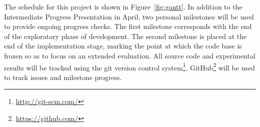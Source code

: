 The schedule for this project is shown in Figure~\ref{fig:gantt}. In
addition to the Intermediate Progress Presentation in April, two
personal milestones will be used to provide ongoing progress
checks. The first milestone corresponds with the end of the
exploratory phase of development. The second milestone is placed at
the end of the implementation stage, marking the point at which the
code base is frozen so as to focus on an extended evaluation. All
source code and experimental results will be tracked using the git
version control system\footnote{\url{http://git-scm.com/}}.
GitHub\footnote{\url{https://github.com/}} will be used to track
issues and milestone progress.
